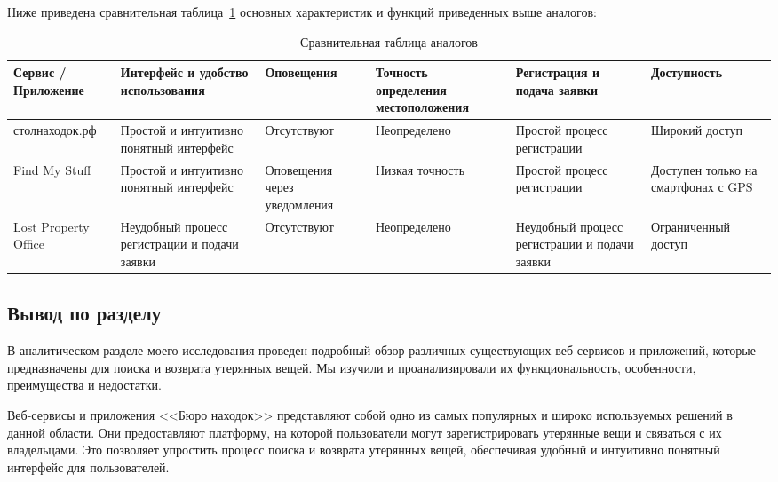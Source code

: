 Ниже приведена сравнительная таблица~\ref{tab:analogs_comparison} основных характеристик и функций приведенных выше аналогов:
\begin{table}[htb]
	\caption{Сравнительная таблица аналогов}
	\centering
	
	\emergencystretch=10pt
	\begin{tabular}{ |p{2cm}|p{3cm}|p{2cm}|p{2cm}|p{3cm}|p{2cm}| } 
		\hline
		Сервис / Приложение & Интерфейс и удобство использования & Опове\-ще\-ния & Точность определения местоположения & Регистрация и подача заявки & Доступ\-ность \\ \hline
		
		стол\-на\-ходок.рф & Простой и интуитивно понятный интерфейс & Отсут\-ству\-ют & Не\-оп\-ре\-де\-ле\-но & Простой процесс регистрации & Широкий доступ \\ \hline
		
		Find My Stuff & Простой и интуитивно понятный интерфейс & Опо\-ве\-ще\-ния через уведомления & Низкая точность & Простой процесс регистрации & Доступен только на смартфонах с GPS \\ \hline
		
		Lost Property Office & Неудобный процесс регистрации и подачи заявки & Отсут\-ству\-ют & Не\-оп\-ре\-де\-ле\-но & Неудобный процесс регистрации и подачи заявки & Огра\-ни\-чен\-ный доступ \\ \hline
	\end{tabular}
	\label{tab:analogs_comparison}
\end{table}

\subsection*{Вывод по разделу}

В аналитическом разделе моего исследования проведен подробный обзор различных существующих веб-сервисов и приложений, которые предназначены для поиска и возврата утерянных вещей. Мы изучили и проанализировали их функциональность, особенности, преимущества и недостатки.

Веб-сервисы и приложения <<Бюро находок>> представляют собой одно из самых популярных и широко используемых решений в данной области. Они предоставляют платформу, на которой пользователи могут зарегистрировать утерянные вещи и связаться с их владельцами. Это позволяет упростить процесс поиска и возврата утерянных вещей, обеспечивая удобный и интуитивно понятный интерфейс для пользователей.\label{key}